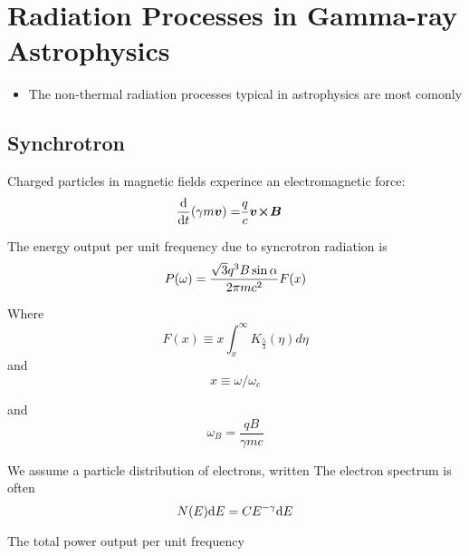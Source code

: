 \section{Radiation Processes in Gamma-ray Astrophysics}


\begin{itemize}
  \item The non-thermal radiation processes typical
    in astrophysics are most comonly
\end{itemize}

\subsection{Synchrotron}

Charged particles in magnetic fields experince an electromagnetic force:
\begin{align}
  \frac{\text{d}}{\text{d}t} (\gamma m \boldsymbol{v}) = & \frac{q}{c} \boldsymbol{v}\!\boldsymbol{\times}\!\boldsymbol{B}
\end{align}

The energy output per unit frequency due to syncrotron radiation is
\begin{equation}
  P(\omega) = \frac{\sqrt{3} q^3 B \sin\alpha}{2\pi m c^2} F(x)
\end{equation}

Where
\begin{equation}
  F(x) \equiv x \int_x^\infty K_{\tfrac{5}{3}} (\eta) d\eta
\end{equation}
and
\begin{equation}
x \equiv \omega/\omega_c
\end{equation}

and
\begin{equation}
  \omega_B = \frac{qB}{\gamma m c}
\end{equation}

We assume a particle distribution of electrons, written 
The electron spectrum is often
\begin{equation}
  N(E) \text{d}E = C E^{-\gamma} \text{d}E
\end{equation}

The total power output per unit frequency 

